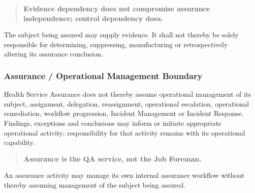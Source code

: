 \label{rad:business:1116}

\begin{quote}

\textbf{Evidence dependency does not compromise assurance independence; control dependency does.}


\end{quote}
\label{rad:business:1118}

The subject being assured may supply evidence. It shall not thereby be solely responsible for determining, suppressing, manufacturing or retrospectively altering its assurance conclusion.

\label{rad:business:1120}
\subsubsection*{Assurance /\allowbreak{} Operational Management Boundary}
\label{rad:business:1122}

Health Service Assurance does not thereby assume operational management of its subject, assignment, delegation, reassignment, operational escalation, operational remediation, workflow progression, Incident Management or Incident Response. Findings, exceptions and conclusions may inform or initiate appropriate operational activity; responsibility for that activity remains with its operational capability.

\label{rad:business:1124}

\begin{quote}

\textbf{Assurance is the QA service, not the Job Foreman.}


\end{quote}
\label{rad:business:1126}

An assurance activity may manage its own internal assurance workflow without thereby assuming management of the subject being assured.

\label{rad:business:1128}

\par\smallskip
{}\label{rad:business:1130}
